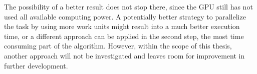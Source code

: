The possibility of a better result does not stop there, since the GPU still has not used all available computing power. A potentially better strategy to parallelize the task by using more work units might result into a much better execution time, or a different approach can be applied in the second step, the most time consuming part of the algorithm. However, within the scope of this thesis, another approach will not be investigated and leaves room for improvement in further development. 


